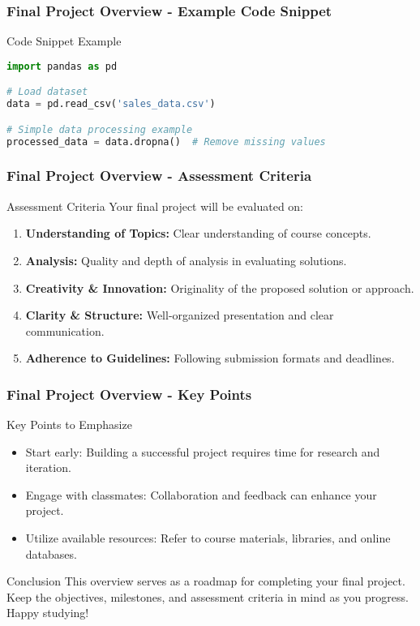 \documentclass[aspectratio=169]{beamer}
\begin{document}
\begin{frame}[fragile]
    \frametitle{Final Project Overview - Example Code Snippet}
    \begin{block}{Code Snippet Example}
    \begin{lstlisting}[language=Python]
import pandas as pd

# Load dataset
data = pd.read_csv('sales_data.csv')

# Simple data processing example
processed_data = data.dropna()  # Remove missing values
    \end{lstlisting}
    \end{block}
\end{frame}

\begin{frame}[fragile]
    \frametitle{Final Project Overview - Assessment Criteria}
    \begin{block}{Assessment Criteria}
        Your final project will be evaluated on:
        \begin{enumerate}
            \item \textbf{Understanding of Topics:} Clear understanding of course concepts.
            \item \textbf{Analysis:} Quality and depth of analysis in evaluating solutions.
            \item \textbf{Creativity \& Innovation:} Originality of the proposed solution or approach.
            \item \textbf{Clarity \& Structure:} Well-organized presentation and clear communication.
            \item \textbf{Adherence to Guidelines:} Following submission formats and deadlines.
        \end{enumerate}
    \end{block}
\end{frame}

\begin{frame}[fragile]
    \frametitle{Final Project Overview - Key Points}
    \begin{block}{Key Points to Emphasize}
        \begin{itemize}
            \item Start early: Building a successful project requires time for research and iteration.
            \item Engage with classmates: Collaboration and feedback can enhance your project.
            \item Utilize available resources: Refer to course materials, libraries, and online databases.
        \end{itemize}
    \end{block}
    \begin{block}{Conclusion}
        This overview serves as a roadmap for completing your final project. Keep the objectives, milestones, and assessment criteria in mind as you progress. Happy studying!
    \end{block}
\end{frame}
\end{document}
